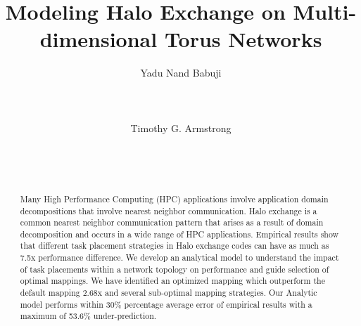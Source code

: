 \documentclass{acm_proc_article-sp}
\begin{document}
\setlength{\pdfpageheight}{\paperheight}
\setlength{\pdfpagewidth}{\paperwidth}


\newcommand{\timnote}[1]{ {\textcolor{maroon} { Tim: #1 }}}
\newcommand{\todo}[1]{ {\textcolor{red} { TODO: #1 }}}

\title{Modeling Halo Exchange on Multi-dimensional Torus Networks}


\author{
\alignauthor
Yadu Nand Babuji\\
       \\
       \\
       \\
\alignauthor
Timothy G. Armstrong\\
       \\
       \\
       \\
}
\maketitle

\begin{abstract}
Many High Performance Computing (HPC) applications involve application domain decompositions that involve nearest neighbor communication.
Halo exchange is a common nearest neighbor communication pattern that arises
as a result of domain decomposition and occurs in a wide range of HPC applications.
Empirical results show that different task placement strategies in Halo exchange codes can have as much as 7.5x performance difference.
We develop an analytical model to understand the impact of task placements within a network topology on performance and guide selection of
optimal mappings.
We have identified an optimized mapping which outperform the default mapping 2.68x and several sub-optimal mapping strategies.
Our Analytic model performs within 30\% percentage average error of empirical results with a maximum of 53.6\% under-prediction.

\end{abstract}
\end{document}
